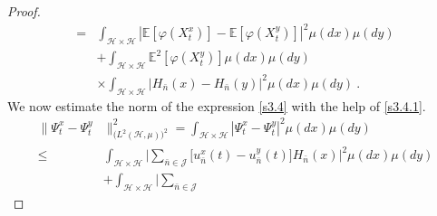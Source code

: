 \documentclass[]{interact}
\newcommand{\E}{\mathbb{E}}
\theoremstyle{plain}%
\theoremstyle{definition}
\theoremstyle{remark}
\begin{document}
\begin{proof}
\begin{equation}
\begin{aligned}
                    =&
                    \int_{\mathcal{H}\times \mathcal{H}}
                    \left|
                            \E 
                            \left [
                                \varphi(X_t^x)
                            \right]
                            -
                            \E\left[
                                \varphi(X_t^y)
                            \right]
                        \right|^2
                        \mu(dx) \mu(dy)
                    \\
                    &+
                    \int_{\mathcal{H}\times \mathcal{H}}
                        \E^2
                        \left[
                            \varphi(X_t^y)
                        \right]
                    \mu(dx)\mu(dy)
                    \\
                    & \times
                    \int_{\mathcal{H}\times \mathcal{H}}
                    \left|
                        H_{\bar n}(x)
                            -
                            H_{\bar n}(y)
                    \right|^2
                    \mu(dx)\mu(dy)
                \ .
            \end{aligned}
            \label{s3.4.1}
        \end{equation}
        We now estimate the norm of the expression \eqref{s3.4} with the help of
        \eqref{s3.4.1}.
        \begin{equation}
        \label{s3.8.1}
            \begin{aligned}
                \| \Psi_t ^ x - \Psi_t ^ y & \|_{
                    \big(
                        L^2(\mathcal{H},\mu)
                    \big)^2
                }^2
                    =
                        \int_{\mathcal{H}\times \mathcal{H}}
                        |\Psi_t^x - \Psi_t^y|^2 \mu(dx) \mu(dy)
                    \\
                    \le&
                    \int_{\mathcal{H} \times \mathcal{H}}
                        \Big|
                            \sum_{\bar n\in \mathcal{J}}
                            \big[
                                u_{\bar n} ^ x(t) - u_{\bar n} ^ y(t)
                            \big]
                            H_{\bar n}(x)
                        \Big|^2
                        \mu(dx) \mu(dy)
                    \\
                    &+
                    \int_{\mathcal{H}\times \mathcal{H}}
                    \Big|
                        \sum_{\bar n\in \mathcal{J}}

\end{aligned}
\end{equation}
\end{proof}
\end{document}
